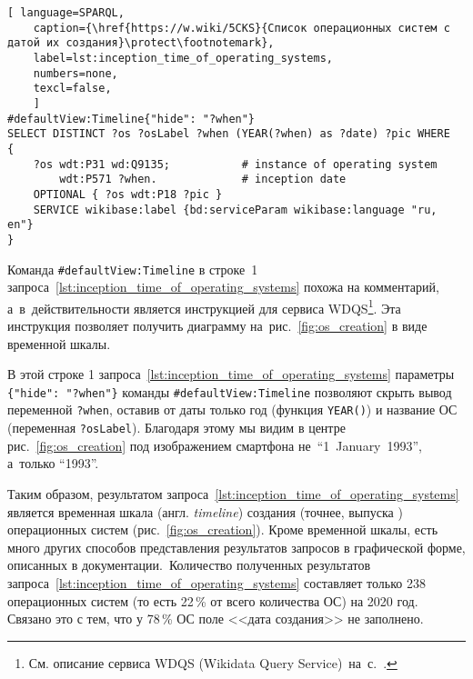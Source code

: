 \begin{lstlisting}[ language=SPARQL, 
	caption={\href{https://w.wiki/5CKS}{Список операционных систем с датой их создания}\protect\footnotemark},
	label=lst:inception_time_of_operating_systems,
    numbers=none,
    texcl=false,
	]
#defaultView:Timeline{"hide": "?when"}
SELECT DISTINCT ?os ?osLabel ?when (YEAR(?when) as ?date) ?pic WHERE
{
    ?os wdt:P31 wd:Q9135;           # instance of operating system
        wdt:P571 ?when.             # inception date
    OPTIONAL { ?os wdt:P18 ?pic }
    SERVICE wikibase:label {bd:serviceParam wikibase:language "ru, en"}
}
\end{lstlisting}


\newpage
{}
Команда \lstinline|#defaultView:Timeline| в строке~1 
запроса~\ref{lst:inception_time_of_operating_systems} 
похожа на комментарий, 
а~в~действительности является инструкцией для сервиса WDQS\footnote{%
    См. описание сервиса WDQS (Wikidata Query Service)~на~с.~\pageref{sect:WDQS}.%
}. 
Эта инструкция позволяет получить диаграмму на~рис.~\ref{fig:os_creation} 
в виде временной шкалы.

В этой строке 1 запроса~\ref{lst:inception_time_of_operating_systems} 
параметры \lstinline|{"hide": "?when"}| 
команды \lstinline|#defaultView:Timeline| позволяют скрыть вывод переменной \lstinline|?when|, 
оставив от даты только год (функция \lstinline|YEAR()|) 
и название ОС (переменная \lstinline|?osLabel|). 
Благодаря этому мы видим в центре рис.~\ref{fig:os_creation} 
под изображением смартфона \mbox{не ``1 January 1993''}, а~только ``1993''. 

Таким образом, результатом запроса~\ref{lst:inception_time_of_operating_systems} 
является временная шкала (англ. \textit{timeline}) создания (точнее, выпуска%
) %
операционных систем (рис.~\ref{fig:os_creation}). 
Кроме временной шкалы, есть много других способов представления результатов запросов 
в графической форме, описанных в документации.\, Количество полученных результатов запроса~\ref{lst:inception_time_of_operating_systems} 
составляет только 238 операционных систем (то есть 22\,\% от всего количества ОС) на 2020 год. 
Связано это с тем, что у 78\,\% ОС поле <<дата создания>> не заполнено.

